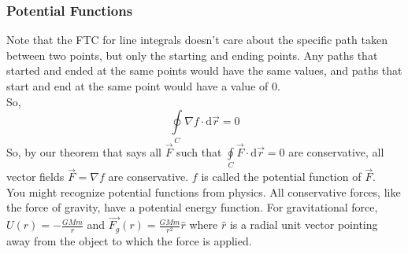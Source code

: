 \subsubsection{Potential Functions}
\noindent
Note that the FTC for line integrals doesn't care about the specific path taken between two points, but only the starting and ending points. Any paths that started and ended at the same points would have the same values, and paths that start and end at the same point would have a value of 0.\\
So, 
\begin{equation*}
	\oint\limits_{C}{\nabla f \cdot \mathrm{d}\vec{r}} = 0
\end{equation*}
So, by our theorem that says all $\vec{F}$ such that $\oint\limits_{C}{\vec{F} \cdot \mathrm{d}\vec{r}} = 0$ are conservative, all vector fields $\vec{F} = \nabla f$ are conservative. $f$ is called the potential function of $\vec{F}$.\\

\noindent
You might recognize potential functions from physics. All conservative forces, like the force of gravity, have a potential energy function. For gravitational force, $U(r) = -\frac{GMm}{r}$ and $\vec{F_g}(r) = \frac{GMm}{r^2}\hat{r}$ where $\hat{r}$ is a radial unit vector pointing away from the object to which the force is applied.